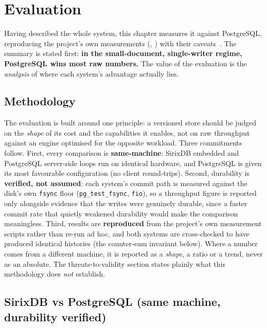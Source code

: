 \documentclass[11pt,a4paper,oneside]{report}
\theoremstyle{sirixthm}
\newcommand{\code}[1]{\texttt{#1}}
\begin{document}
\chapter{Evaluation}
\label{ch:eval}

Having described the whole system, this chapter measures it against PostgreSQL, reproducing the
project's own measurements (,
) with their caveats~\cite{sirixdocs}. The summary is stated first: \textbf{in the
small-document, single-writer regime, PostgreSQL wins most raw numbers.} The value of the
evaluation is the \emph{analysis} of where each system's advantage actually lies.

\section{Methodology}

The evaluation is built around one principle: a versioned store should be judged on the \emph{shape} of
its cost and the capabilities it enables, not on raw throughput against an engine optimised for the
opposite workload. Three commitments follow. First, every comparison is \textbf{same-machine}: SirixDB
embedded and PostgreSQL server-side loops run on identical hardware, and PostgreSQL is given its most
favourable configuration (no client round-trips). Second, durability is \textbf{verified, not assumed}:
each system's commit path is measured against the disk's own \code{fsync} floor (\code{pg\_test\_fsync},
\code{fio}), so a throughput figure is reported only alongside evidence that the writes were genuinely
durable, since a faster commit rate that quietly weakened durability would make the comparison
meaningless. Third, results are \textbf{reproduced} from the project's own measurement scripts rather
than re-run ad hoc, and both systems are cross-checked to have produced identical histories (the
counter-sum invariant below). Where a number comes from a different machine, it is reported as a
\emph{shape}, a ratio or a trend, never as an absolute. The threats-to-validity section states plainly
what this methodology does \emph{not} establish.

\section{SirixDB vs PostgreSQL (same machine, durability verified)}
\label{sec:w1}
\end{document}
